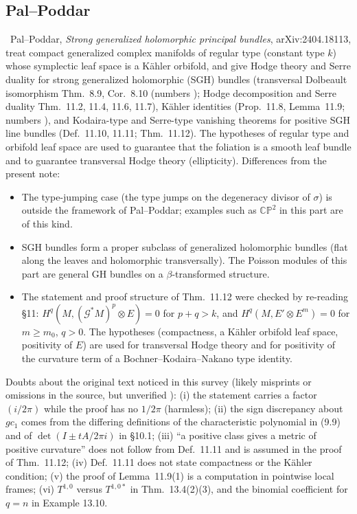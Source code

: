 \subsection{Pal--Poddar}
\tC\ Pal--Poddar, \emph{Strong generalized holomorphic principal bundles}, arXiv:2404.18113, treat compact generalized complex manifolds of regular type (constant type $k$) whose symplectic leaf space is a K\"ahler orbifold, and give Hodge theory and Serre duality for strong generalized holomorphic (SGH) bundles (transversal Dolbeault isomorphism Thm.~8.9, Cor.~8.10 (numbers \tQ); Hodge decomposition and Serre duality Thm.~11.2, 11.4, 11.6, 11.7), K\"ahler identities (Prop.~11.8, Lemma~11.9; numbers \tQ), and Kodaira-type and Serre-type vanishing theorems for positive SGH line bundles (Def.~11.10, 11.11; Thm.~11.12). The hypotheses of regular type and orbifold leaf space are used to guarantee that the foliation is a smooth leaf bundle and to guarantee transversal Hodge theory (ellipticity). Differences from the present note:
\begin{itemize}
\item The type-jumping case (the type jumps on the degeneracy divisor of $\sigma$) is outside the framework of Pal--Poddar; examples such as $\mathbb{CP}^2$ in this part are of this kind.
\item SGH bundles form a proper subclass of generalized holomorphic bundles (flat along the leaves and holomorphic transversally). The Poisson modules of this part are general GH bundles on a $\beta$-transformed structure.
\item The statement and proof structure of Thm.~11.12 were checked by re-reading \S11: $H^q(M,(\mathcal G^*M)^p\otimes E)=0$ for $p+q>k$, and $H^q(M,E'\otimes E^m)=0$ for $m\ge m_0$, $q>0$. The hypotheses (compactness, a K\"ahler orbifold leaf space, positivity of $E$) are used for transversal Hodge theory and for positivity of the curvature term of a Bochner--Kodaira--Nakano type identity.
\end{itemize}
Doubts about the original text noticed in this survey (likely misprints or omissions in the source, but unverified \tQ): (i) the statement carries a factor $(i/2\pi)$ while the proof has no $1/2\pi$ (harmless); (ii) the sign discrepancy about $gc_1$ comes from the differing definitions of the characteristic polynomial in (9.9) and of $\det(I\pm tA/2\pi i)$ in \S10.1; (iii) ``a positive class gives a metric of positive curvature'' does not follow from Def.~11.11 and is assumed in the proof of Thm.~11.12; (iv) Def.~11.11 does not state compactness or the K\"ahler condition; (v) the proof of Lemma~11.9(1) is a computation in pointwise local frames; (vi) $T^{1,0}$ versus $T^{1,0*}$ in Thm.~13.4(2)(3), and the binomial coefficient for $q=n$ in Example 13.10.

